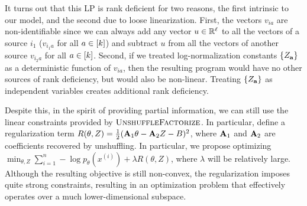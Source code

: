 It turns out that this LP is rank deficient for two reasons,
the first intrinsic to our model,
and the second due to loose linearization.
First, the vectors $v_{ia}$ are non-identifiable since we can always add any vector $u \in \mathbb{R}^\ell$ to
all the vectors of a source $i_1$ ($v_{i_1 a}$ for all $a \in [k]$)
and subtract $u$ from all the vectors of another source $v_{i_2 a}$ for all $a \in [k]$.
Second, if we treated log-normalization constants $\{Z_{\mathbf{a}}\}$ as a deterministic
function of $v_{ia}$, then the resulting program would have no other sources
of rank deficiency, but would also be non-linear.
Treating $\{Z_{\mathbf{a}}\}$ as independent variables creates additional rank
deficiency.

Despite this, in the spirit of providing partial information,
we can still use the linear constraints provided by $\text{\sc UnshuffleFactorize}$.
In particular, define a regularization term
$R(\theta, Z) = \frac{1}{2} (\mathbf{A}_1 \theta - \mathbf{A}_2 Z - B)^2$, where $\mathbf{A}_1$ and $\mathbf{A}_2$ are coefficients
recovered by unshuffling.
In particular, we propose optimizing $\min_{\theta, Z} \sum_{i=1}^n -\log
p_\theta(x^{(i)}) + \lambda R(\theta, Z)$,
where $\lambda$ will be relatively large.
Although the resulting objective is still non-convex,
the regularization imposes quite strong constraints,
resulting in an optimization problem
that effectively operates over a much lower-dimensional subspace.
